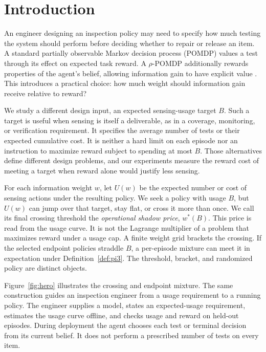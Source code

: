 \documentclass[manuscript, screen, review]{jair}
\begin{document}

\maketitle

\section{Introduction}

An engineer designing an inspection policy may need to specify how much testing the system should perform before deciding whether to repair or release an item. A standard partially observable Markov decision process (POMDP) values a test through its effect on expected task reward. A $\rho$-POMDP additionally rewards properties of the agent's belief, allowing information gain to have explicit value \citep{araya2010}. This introduces a practical choice: how much weight should information gain receive relative to reward?

We study a different design input, an expected sensing-usage target $B$. Such a target is useful when sensing is itself a deliverable, as in a coverage, monitoring, or verification requirement. It specifies the average number of tests or their expected cumulative cost. It is neither a hard limit on each episode nor an instruction to maximize reward subject to spending at most $B$. Those alternatives define different design problems, and our experiments measure the reward cost of meeting a target when reward alone would justify less sensing.

For each information weight $w$, let $U(w)$ be the expected number or cost of sensing actions under the resulting policy. We seek a policy with usage $B$, but $U(w)$ can jump over that target, stay flat, or cross it more than once. We call its final crossing threshold the \emph{operational shadow price}, $w^*(B)$. This price is read from the usage curve. It is not the Lagrange multiplier of a problem that maximizes reward under a usage cap. A finite weight grid brackets the crossing. If the selected endpoint policies straddle $B$, a per-episode mixture can meet it in expectation under Definition~\ref{def:pi3}. The threshold, bracket, and randomized policy are distinct objects.

Figure~\ref{fig:hero} illustrates the crossing and endpoint mixture. The same construction guides an inspection engineer from a usage requirement to a running policy. The engineer supplies a model, states an expected-usage requirement, estimates the usage curve offline, and checks usage and reward on held-out episodes. During deployment the agent chooses each test or terminal decision from its current belief. It does not perform a prescribed number of tests on every item.
\end{document}
